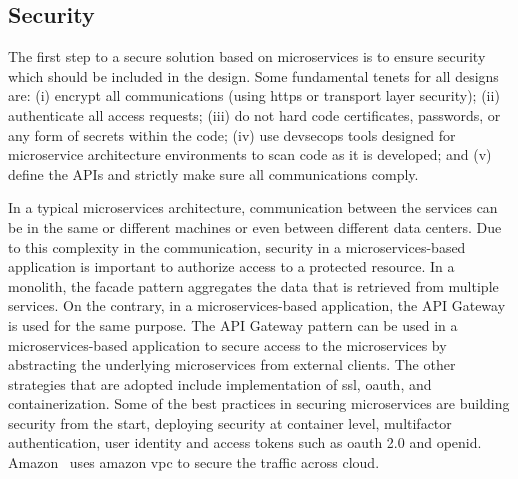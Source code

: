 

\subsection{Security}%
The first step to a secure solution based on microservices is to ensure security which should be included in the design. Some fundamental tenets\cite{Olaf2016} for all designs are: 
(i) encrypt all communications (using https or transport layer security); 
(ii) authenticate all access requests;
(iii) do not hard code certificates, passwords, or any form of secrets within the code;
(iv) use devsecops tools designed for microservice architecture environments to scan code as it is developed;
and (v) define the APIs and strictly make sure all communications comply.

In a typical microservices architecture, communication between the services can be in the same or different machines or even between different data centers. Due to this complexity in the communication, security in a microservices-based application is important to authorize access to a protected resource.
In a monolith, the facade pattern aggregates the data that is retrieved from multiple services. On the contrary, in a microservices-based application, the API Gateway is used for the same purpose. The API Gateway pattern can be used in a microservices-based application to secure access to the microservices by abstracting the underlying microservices from external clients. The other strategies that are adopted include implementation of ssl, oauth, and containerization.\cite{Zaytev2018, Monterio2018, tenev2019}
%
Some of the best practices in securing microservices are building security from the start, deploying security at container level, multifactor authentication, user identity and access tokens such as oauth 2.0 and openid.\cite{Gonchar2017} Amazon~\cite{Amazon} uses amazon vpc to secure the traffic across cloud.


